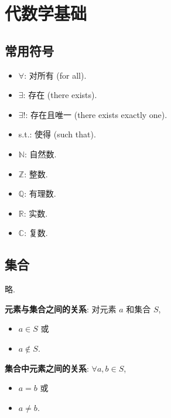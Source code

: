 \documentclass{note}
\begin{document}
\setcounter{chapter}{-1}
\fi
\chapter{代数学基础}
\section{常用符号}
\begin{itemize}
    \item $\forall$: 对所有 (for all).
    \item $\exists$: 存在 (there exists).
    \item $\exists!$: 存在且唯一 (there exists exactly one).
    \item s.t.: 使得 (such that).
    \item $\mathbb{N}$: 自然数.
    \item $\mathbb{Z}$: 整数.
    \item $\mathbb{Q}$: 有理数.
    \item $\mathbb{R}$: 实数.
    \item $\mathbb{C}$: 复数.
\end{itemize}

\section{集合}
\begin{df}[集合 (Set)]
    略.
\end{df}

\textbf{元素与集合之间的关系}: 对元素 $a$ 和集合 $S$,
\begin{itemize}
    \item $a\in S$ 或
    \item $a\notin S$.
\end{itemize}

\textbf{集合中元素之间的关系}: $\forall a,b\in S$,
\begin{itemize}
    \item $a=b$ 或
    \item $a\neq b$.
\end{itemize}
\end{document}
